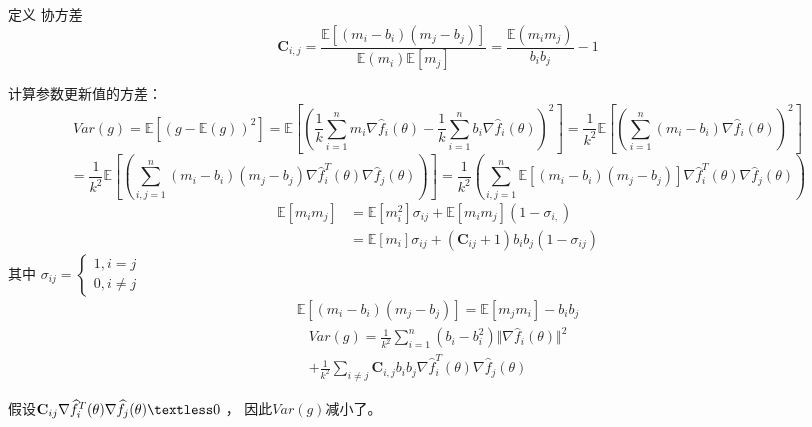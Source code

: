 \documentclass{article}
\begin{document}
		定义 协方差
		\begin{equation}
			\mathbf{C}_{i,j} = \frac{\mathbb{E}[(m_i-b_i)(m_j-b_j)]}{\mathbb{E}(m_i)\mathbb{E}[m_j]}=\frac{\mathbb{E}(m_im_j)}{b_ib_j}-1
		\end{equation}
		
		计算参数更新值的方差：
		\begin{equation}
			Var(g) = \mathbb{E}[(g-\mathbb{E}(g))^2] = \mathbb{E}[(\frac{1}{k}\sum_{i=1}^nm_i\nabla\widehat{f}_i(\theta)-\frac{1}{k}\sum_{i=1}^nb_i\nabla\widehat{f}_i(\theta))^2]=\frac{1}{k^2}\mathbb{E}[(\sum_{i=1}^n(m_i-b_i)\nabla\widehat{f}_i(\theta))^2]
		\end{equation}
		\begin{equation}
			=\frac{1}{k^2}\mathbb{E}[(\sum_{i,j=1}^n(m_i-b_i)(m_j-b_j)\nabla\widehat{f}_i^T(\theta)\nabla\widehat{f}_j(\theta))]=\frac{1}{k^2}(\sum_{i,j=1}^n\mathbb{E}[(m_i-b_i)(m_j-b_j)]\nabla\widehat{f}_i^T(\theta)\nabla\widehat{f}_j(\theta))
		\end{equation}
		\begin{equation}
			\begin{split}
			\mathbb{E}[m_im_j]&=\mathbb{E}[m_i^2]\sigma_{ij}+\mathbb{E}[m_im_j](1-\sigma_{i,})\\
			&=\mathbb{E}[m_i]\sigma_{ij}+(\mathbf{C}_{ij}+1)b_ib_j(1-\sigma_{ij})
			\end{split}
		\end{equation}
		其中 $\sigma_{ij}=
		\begin{cases}
			1,i=j\\
			0,i\neq j
		\end{cases}$
		\begin{equation}
			\begin{split}
					\mathbb{E}[(m_i-b_i)(m_j-b_j)]=\mathbb{E}[m_jm_i]-b_ib_j
			\end{split}
		\end{equation}
		\begin{equation}
			\begin{split}
				Var(g)=\frac{1}{k^2}\sum_{i=1}^{n}(b_i-b_i^2)\Vert\nabla\widehat{f}_i(\theta)\Vert^2\\
				+\frac{1}{k^2}\sum_{i\neq j}\mathbf{C}_{i,j}b_ib_j\nabla\widehat{f}_i^T(\theta)\nabla\widehat{f}_j(\theta)
			\end{split}
		\end{equation}
		
		假设$\mathbf{C}_{ij}\nabla\widehat{f}_i^T(\theta)\nabla\widehat{f}_j(\theta) \textless 0$
		， 因此$Var(g)$减小了。
		
	
\end{document}

